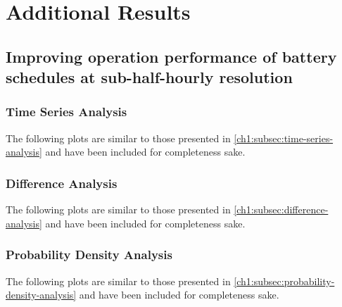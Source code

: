 \chapter{Additional Results}
\label{appx-a:additional-results}

\section{Improving operation performance of battery schedules at sub-half-hourly resolution}
\label{appx-a:ch1}

\subsection{Time Series Analysis}

The following plots are similar to those presented in \ref{ch1:subsec:time-series-analysis} and have been included for completeness sake.



\subsection{Difference Analysis}

The following plots are similar to those presented in \ref{ch1:subsec:difference-analysis} and have been included for completeness sake.



\subsection{Probability Density Analysis}

The following plots are similar to those presented in \ref{ch1:subsec:probability-density-analysis} and have been included for completeness sake.

